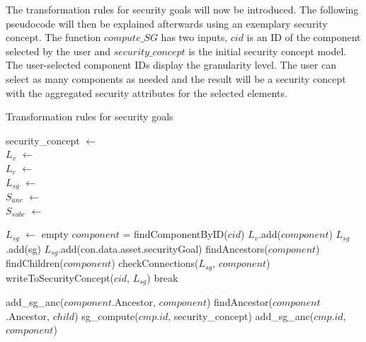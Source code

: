 The transformation rules for security goals will now be introduced. The following pseudocode will then be explained afterwards using an exemplary security concept. The function  $compute\_SG$ has two inputs, $cid$ is  an ID of the component selected by the user and $security\_concept$ is the initial security concept model. The user-selected component IDs display the granularity level. The user can select as many components as needed and the result will be a security concept with the aggregated security attributes for the selected elements.

\begin{algorithm}[H]
\caption{Transformation rules for security goals}
security\_concept $\gets$  \\
$L_v$ $\gets$  \\
$L_c$ $\gets$  \\
$L_{sg}$ $\gets$  \\
$S_{anc}$ $\gets$  \\
$S_{subc}$ $\gets$  \\

\begin{algorithmic}[1]

\State $L_{sg}$ $\gets$ empty
\State $component$ = findComponentByID($cid$)
\State $L_v$.add($component$) \label{line:visited}
 \label{line:iterate_own_sg}
	\State $L_{sg}$.add(sg)	
\EndFor
{}
\State $L_{sg}$.add(con.data.asset.securityGoal)
\EndFor
\State findAncestors($component$) 
\State findChildren($component$) 
\State checkConnections($L_{sg}$, $component$)
\State writeToSecurityConcept($cid$, $L_{sg}$) 
\Else
\State break
\EndIf
\EndFunction

\EndIf
\State add\_sg\_anc($component$.Ancestor, $component$)
\State findAncestor($component$.Ancestor, $child$)
\Else
{}
\State sg\_compute($cmp.id$, security\_concept) \label{line:ancestor}
\State add\_sg\_anc($cmp.id$, $component$)
\EndFor
\EndIf

\EndFunction
{} 

\end{algorithmic}
\end{algorithm}


